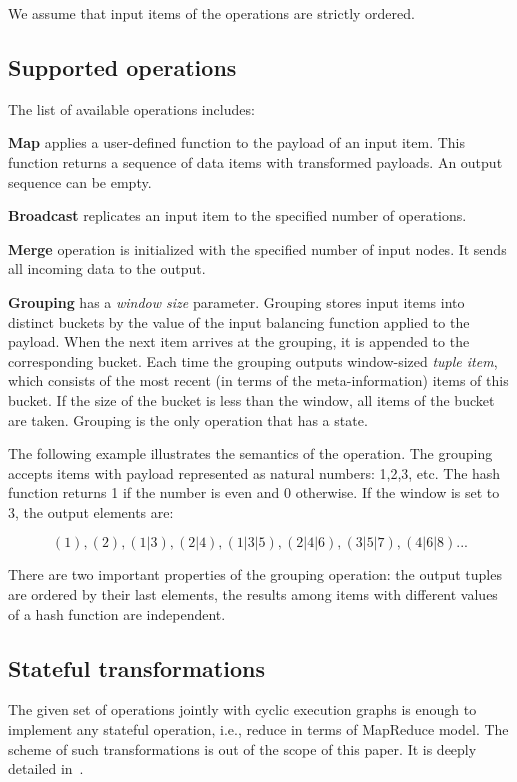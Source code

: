 We assume that input items of the operations are strictly ordered.

\subsection{Supported operations}
The list of available operations includes:

{\bf Map} applies a user-defined function to the payload of an input item. This function returns a sequence of data items with transformed payloads. An output sequence can be empty.

{\bf Broadcast} replicates an input item to the specified number of operations.

{\bf Merge} operation is initialized with the specified number of input nodes. It sends all incoming data to the output.

{\bf Grouping} has a {\it window size} parameter. Grouping stores input items into distinct buckets by the value of the input balancing function applied to the payload. When the next item arrives at the grouping, it is appended to the corresponding bucket. Each time the grouping outputs window-sized {\it tuple item}, which consists of the most recent (in terms of the meta-information) items of this bucket. If the size of the bucket is less than the window, all items of the bucket are taken. Grouping is the only operation that has a state.

The following example illustrates the semantics of the operation. The grouping accepts items with payload represented as natural numbers: 1,2,3, etc. The hash function returns 1 if the number is even and 0 otherwise. If the window is set to 3, the output elements are:

\[(1), (2), (1|3), (2|4), (1|3|5), (2|4|6), (3|5|7), (4|6|8)...\]

There are two important properties of the grouping operation: the output tuples are ordered by their last elements, the results among items with different values of a hash function are independent.

\subsection{Stateful transformations}
The given set of operations jointly with cyclic execution graphs is enough to implement any stateful operation, i.e., reduce in terms of MapReduce model. The scheme of such transformations is out of the scope of this paper. It is deeply detailed in~\cite{hiddenSeim}.

